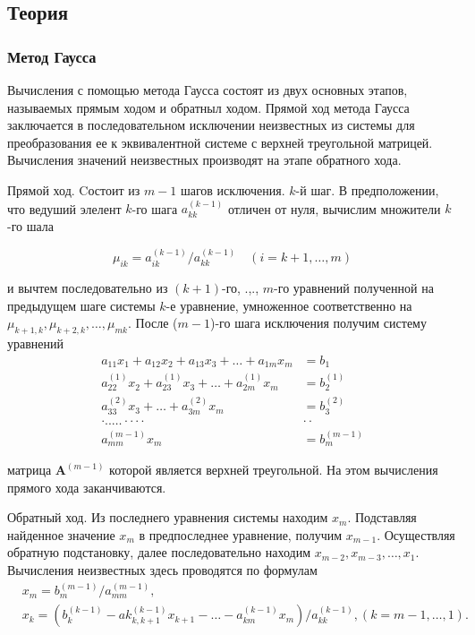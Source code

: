 \documentclass[a4paper,11pt]{article}
\theoremstyle{definition} %
\theoremstyle{remark} %
\begin{document}
\subsection{Теория}

\subsubsection{Метод Гаусса}

Вычисления с помощью метода Гаусса состоят из двух основных этапов, называемых прямым ходом и обратныл ходом. 
Прямой ход метода Гаусса заключается в последовательном исключении неизвестных из системы для преобразования ее к эквивалентной системе с верхней треугольной матрицей.
Вычисления значений неизвестных производят на этапе обратного хода.

Прямой ход. Cостоит из $m-1$ шагов исключения. $k$-й шаг. В предположении, что ведуший элелент $k$-го шага $a_{kk}^{(k-1)}$ отличен от нуля, вычислим множители $k$-го шала


$$\mu_{i k}=a_{i k}^{(k-1)} / a_{kk}^{(k-1)} \quad(i=k+1, \ldots, m)$$

и вычтем последовательно из $(k+1)$-го, .,., $m$-го уравнений полученной на предыдущем шаге системы $k$-е уравнение, умноженное соответственно на $\mu_{k+1, k}, \mu_{k+2, k}, \ldots, \mu_{m k}$.
После ($m-1$)-го шага исключения получим систему уравнений
$$
\begin{aligned}
a_{11} x_1+a_{12} x_2+a_{13} x_3+\ldots+a_{1 m} x_m & =b_1 \\
a_{22}^{(1)} x_2+a_{23}^{(1)} x_3+\ldots+a_{2 m}^{(1)} x_m & =b_2^{(1)} \\
a_{33}^{(2)} x_3+\ldots+a_{3 m}^{(2)} x_m & =b_3^{(2)} \\
\cdot . . \ldots \cdot \cdot \cdot \cdot & \cdot \cdot \\
a_{m m}^{(m-1)} x_m & =b_m^{(m-1)}
\end{aligned}
$$

матрица $\boldsymbol{A}^{(m-1)}$ которой является верхней треугольной. На этом вычисления прямого хода заканчиваются.

Обратный ход. Из последнего уравнения системы находим $x_m$. Подставляя найденное значение $x_m$ в предпоследнее уравнение, получим $x_{m-1}$. Осуществляя обратную подстановку, далее последовательно находим $x_{m-2}, x_{m-3}, \ldots, x_1$. Вычисления неизвестных здесь проводятся по формулам
$$
\begin{aligned}
& x_m=b_m^{(m-1)} / a_{m m}^{(m-1)}, \\
& x_k=\left(b_k^{(k-1)}-a k_{k, k+1}^{(k-1)} x_{k+1}-\ldots-a_{km}^{(k-1)} x_m\right) / a_{kk}^{(k-1)},(k=m-1, \ldots, 1) .
\end{aligned}
$$
\end{document}
